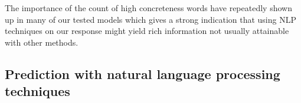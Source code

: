 \documentclass[12pt, a4paper]{article}
\begin{document}
The importance of the count of high concreteness words have repeatedly shown up in many of our tested models which gives a strong indication that using NLP techniques on our response might yield rich information not usually attainable with other methods.

\clearpage

\subsection{Prediction with natural language processing techniques}

\end{document}
